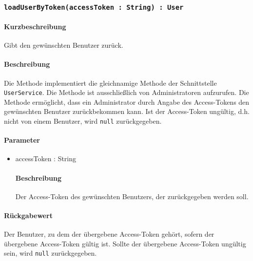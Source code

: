 \subsubsection{\texttt{loadUserByToken(accessToken : String) : User}}%
\paragraph*{Kurzbeschreibung}
Gibt den gewünschten Benutzer zurück.
\paragraph*{Beschreibung}
Die Methode implementiert die gleichnamige Methode der Schnittstelle \texttt{UserService}.
Die Methode ist ausschließlich von Administratoren aufzurufen.
Die Methode ermöglicht, dass ein Administrator durch Angabe des Access-Tokens den gewünschten Benutzer zurückbekommen kann. 
Ist der Access-Token ungültig, d.h. nicht von einem Benutzer, wird \texttt{null} zurückgegeben.
\paragraph*{Parameter}
\begin{itemize}
    \item accessToken : String
    		\paragraph*{Beschreibung}
    		Der Access-Token des gewünschten Benutzers, der zurückgegeben werden soll.
\end{itemize}
\paragraph*{Rückgabewert}
Der Benutzer, zu dem der übergebene Access-Token gehört, sofern der übergebene Access-Token gültig ist.
Sollte der übergebene Access-Token ungültig sein, wird \texttt{null} zurückgegeben.
